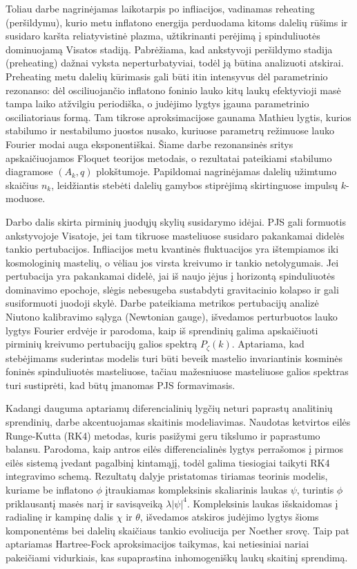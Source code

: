 Toliau darbe nagrinėjamas laikotarpis po infliacijos, vadinamas reheating (peršildymu), kurio metu inflatono energija perduodama kitoms dalelių rūšims ir susidaro karšta reliatyvistinė plazma, užtikrinanti perėjimą į spinduliuotės dominuojamą Visatos stadiją. Pabrėžiama, kad ankstyvoji
peršildymo stadija (preheating) dažnai vyksta neperturbatyviai, todėl ją būtina analizuoti atskirai. Preheating metu dalelių kūrimasis gali būti itin intensyvus dėl parametrinio rezonanso: dėl osciliuojančio inflatono foninio lauko kitų laukų efektyvioji masė tampa laiko atžvilgiu periodiška,
o judėjimo lygtys įgauna parametrinio osciliatoriaus formą. Tam tikrose aproksimacijose gaunama Mathieu lygtis, kurios stabilumo ir nestabilumo juostos nusako, kuriuose parametrų režimuose lauko Fourier modai auga eksponentiškai. Šiame darbe rezonansinės sritys apskaičiuojamos Floquet teorijos metodais, o rezultatai pateikiami stabilumo diagramose $(A_k,q)$ plokštumoje. Papildomai nagrinėjamas dalelių užimtumo skaičius $n_k$, leidžiantis stebėti dalelių gamybos stiprėjimą skirtinguose impulsų $k$-moduose.

Darbo dalis skirta pirminių juodųjų skylių susidarymo idėjai. PJS gali formuotis ankstyvojoje Visatoje, jei tam tikruose masteliuose susidaro pakankamai didelės tankio pertubacijos. Infliacijos metu kvantinės fluktuacijos yra ištempiamos iki kosmologinių mastelių, o vėliau jos virsta kreivumo ir tankio netolygumais. Jei pertubacija yra pakankamai didelė, jai iš naujo įėjus į horizontą spinduliuotės dominavimo epochoje, slėgis nebesugeba sustabdyti gravitacinio kolapso ir gali susiformuoti juodoji skylė. Darbe pateikiama metrikos pertubacijų analizė Niutono kalibravimo sąlyga (Newtonian gauge), išvedamos perturbuotos lauko lygtys Fourier erdvėje ir parodoma, kaip iš sprendinių galima apskaičiuoti pirminių kreivumo pertubacijų galios spektrą $P_\zeta(k)$. Aptariama, kad
stebėjimams suderintas modelis turi būti beveik mastelio invariantinis kosminės foninės spinduliuotės masteliuose, tačiau mažesniuose masteliuose galios spektras turi sustiprėti, kad būtų įmanomas PJS
formavimasis.

Kadangi dauguma aptariamų diferencialinių lygčių neturi paprastų analitinių sprendinių, darbe akcentuojamas skaitinis modeliavimas. Naudotas ketvirtos eilės Runge-Kutta (RK4) metodas, kuris pasižymi geru tikslumo ir paprastumo balansu. Parodoma, kaip antros eilės differencialinės lygtys perrašomos į pirmos eilės sistemą įvedant pagalbinį kintamąjį, todėl galima tiesiogiai taikyti RK4 integravimo schemą. Rezultatų dalyje pristatomas tiriamas teorinis modelis, kuriame be inflatono $\phi$ įtraukiamas kompleksinis skaliarinis laukas $\psi$, turintis $\phi$ priklausantį masės narį ir savisąveiką $\lambda|\psi|^4$. Kompleksinis laukas išskaidomas į radialinę ir kampinę dalis $\chi$ ir $\theta$, išvedamos atskiros judėjimo lygtys šioms komponentėms bei dalelių skaičiaus tankio evoliucija per Noether srovę. Taip pat aptariamas Hartree-Fock aproksimacijos taikymas, kai netiesiniai nariai pakeičiami vidurkiais, kas supaprastina inhomogeniškų laukų skaitinį sprendimą.

